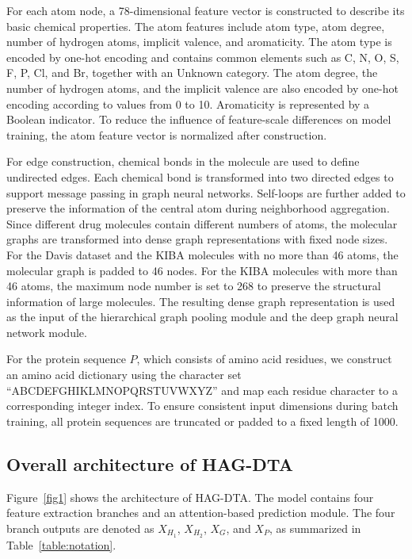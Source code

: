 \documentclass[pdflatex,sn-mathphys-num]{sn-jnl}%
\theoremstyle{thmstyleone}%
\theoremstyle{thmstyletwo}%
\theoremstyle{thmstylethree}%
\begin{document}
For each atom node, a 78-dimensional feature vector is constructed to describe its basic chemical properties. The atom features include atom type, atom degree, number of hydrogen atoms, implicit valence, and aromaticity. The atom type is encoded by one-hot encoding and contains common elements such as C, N, O, S, F, P, Cl, and Br, together with an Unknown category. The atom degree, the number of hydrogen atoms, and the implicit valence are also encoded by one-hot encoding according to values from 0 to 10. Aromaticity is represented by a Boolean indicator. To reduce the influence of feature-scale differences on model training, the atom feature vector is normalized after construction.

For edge construction, chemical bonds in the molecule are used to define undirected edges. Each chemical bond is transformed into two directed edges to support message passing in graph neural networks. Self-loops are further added to preserve the information of the central atom during neighborhood aggregation. Since different drug molecules contain different numbers of atoms, the molecular graphs are transformed into dense graph representations with fixed node sizes. For the Davis dataset and the KIBA molecules with no more than 46 atoms, the molecular graph is padded to 46 nodes. For the KIBA molecules with more than 46 atoms, the maximum node number is set to 268 to preserve the structural information of large molecules. The resulting dense graph representation is used as the input of the hierarchical graph pooling module and the deep graph neural network module.

For the protein sequence $P$, which consists of amino acid residues, we construct an amino acid dictionary using the character set ``ABCDEFGHIKLMNOPQRSTUVWXYZ'' and map each residue character to a corresponding integer index. To ensure consistent input dimensions during batch training, all protein sequences are truncated or padded to a fixed length of 1000.

\subsection{Overall architecture of HAG-DTA}\label{subsec:overall_architecture}

Figure~\ref{fig1} shows the architecture of HAG-DTA. The model contains four feature extraction branches and an attention-based prediction module. The four branch outputs are denoted as $X_{H_1}$, $X_{H_2}$, $X_G$, and $X_P$, as summarized in Table~\ref{table:notation}.
\end{document}

